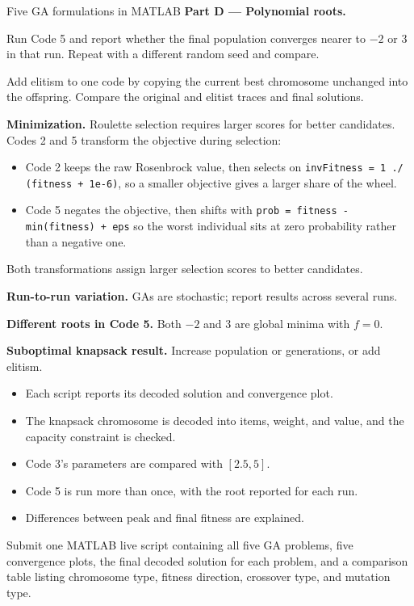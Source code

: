 \begin{labproject}{Five GA formulations in MATLAB}
\medskip\noindent\textbf{Part D --- Polynomial roots.}\par
Run Code 5 and report whether the final population converges nearer to \(-2\) or 3 in that run. Repeat with a different random seed and compare.

\begin{tryit}
Add elitism to one code by copying the current best chromosome unchanged into the offspring. Compare the original and elitist traces and final solutions.
\end{tryit}

\begin{troubleshoot}
\textbf{Minimization.} Roulette selection requires larger scores for better candidates. Codes 2 and 5 transform the objective during selection:

\begin{itemize}
  \item Code 2 keeps the raw Rosenbrock value, then selects on \texttt{invFitness = 1 ./ (fitness + 1e-6)}, so a smaller objective gives a larger share of the wheel.
  \item Code 5 negates the objective, then shifts with \texttt{prob = fitness - min(fitness) + eps} so the worst individual sits at zero probability rather than a negative one.
\end{itemize}

Both transformations assign larger selection scores to better candidates.

\textbf{Run-to-run variation.} GAs are stochastic; report results across several runs.

\textbf{Different roots in Code 5.} Both $-2$ and $3$ are global minima with $f=0$.

\textbf{Suboptimal knapsack result.} Increase population or generations, or add elitism.
\end{troubleshoot}
\end{labproject}

\begin{verification}
\begin{itemize}
  \item Each script reports its decoded solution and convergence plot.
  \item The knapsack chromosome is decoded into items, weight, and value, and the capacity constraint is checked.
  \item Code 3's parameters are compared with $[2.5,5]$.
  \item Code 5 is run more than once, with the root reported for each run.
  \item Differences between peak and final fitness are explained.
\end{itemize}
\end{verification}

\begin{labdeliverable}
Submit one MATLAB live script containing all five GA problems, five convergence plots, the final decoded solution for each problem, and a comparison table listing chromosome type, fitness direction, crossover type, and mutation type.
\end{labdeliverable}
